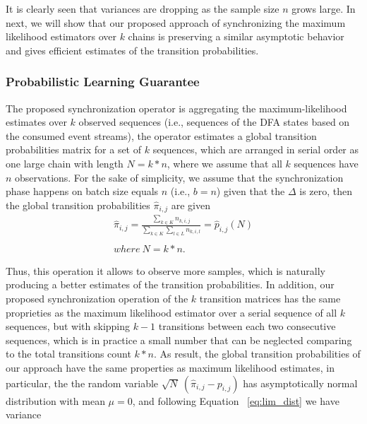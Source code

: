 It is clearly seen that variances are dropping as the sample size $n$ grows large.  In next, we will show that our proposed approach of synchronizing the maximum likelihood estimators over $k$ chains is preserving  a similar asymptotic behavior and gives efficient estimates of the transition probabilities.


\subsubsection{Probabilistic Learning Guarantee}
\par The proposed synchronization operator is aggregating the maximum-likelihood estimates over $k$ observed sequences (i.e., sequences of the DFA states based on the consumed event streams), the operator estimates a global transition probabilities matrix for a set of $k$ sequences, which are arranged in serial order as one large chain with length $N=k*n$, where we assume that all $k$ sequences have $n$ observations. For the sake of simplicity, we assume that the synchronization phase happens on batch size equals $n$ (i.e., $b=n$) given that the $\Delta$ is zero, then the global transition probabilities $\hat{\pi}_{i,j}$ are given 
\begin{equation}
\label{eq:dis_pi_estim2}
	\begin{aligned}
\hat{\pi}_{i,j}=\frac{\sum_{k \in K} n_{k,i,j}}{\sum_{k \in K} \sum_{l \in L} n_{k,i,l}} = \hat{p}_{i,j}(N)\\\\
 where\ N = k*n.
 \end{aligned}
\end{equation}

\par Thus, this operation it allows to observe more samples, which is naturally producing a better estimates of the transition probabilities. In addition, our proposed synchronization operation of the $k$ transition matrices has the same proprieties as the maximum likelihood estimator over a serial sequence of all $k$ sequences, but with skipping $k-1$ transitions between each two consecutive sequences, which is in practice a small number that can be neglected comparing to the total transitions count $k*n$. As result, the global transition probabilities of our approach  have the same properties as maximum likelihood estimates, in particular, the the random variable $\sqrt{N}\ (\hat{\pi}_{i,j} - {p}_{i,j})$ has asymptotically normal distribution with mean $\mu=0$, and  following Equation ~\ref{eq:lim_dist} we have variance 

